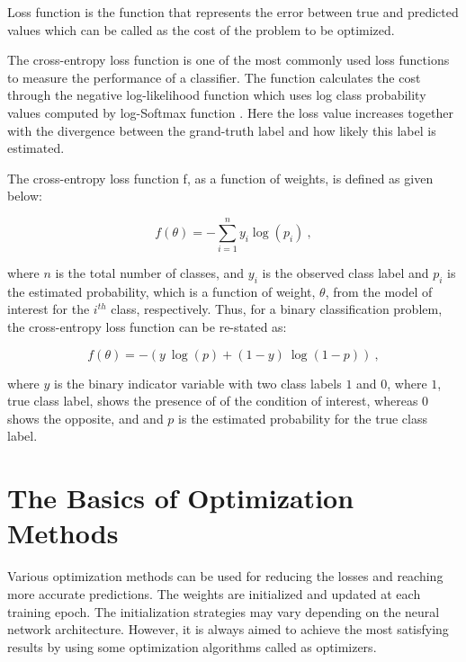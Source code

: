 Loss function is the function that represents the error between true and predicted values which can be called as the cost of the problem to be optimized.

The cross-entropy loss function is one of the most commonly used loss functions to measure the performance of a classifier. The function calculates the cost through the negative log-likelihood function \cite{negative-ll} which uses log class probability values computed by log-Softmax function \cite{logsoftmax}. Here the loss value increases together with the divergence between the grand-truth label and how likely this label is estimated.

The cross-entropy loss function f, as a function of weights, is defined as given below:

\begin{equation}
\label{eq:cross_entropy_loss_formulae}
    f(\theta) = - \sum_{i=1}^{n} y_{i} \log(p_{i}) \:,
\end{equation}

where $n$ is the total number of classes, and $y_{i}$ is the observed class label and $p_{i}$ is the estimated probability, which is a function of weight, $\theta$, from the model of interest for the $i^{th}$ class, respectively. Thus, for a binary classification problem, the cross-entropy loss function can be re-stated as:

\begin{equation}
\label{eq:binary_cross_entropy_loss_formulae}
    f(\theta) = - \left ( y\:\log(p) + (1 - y)\:\log(1-p) \right ) \:,
\end{equation}

where $y$ is the binary indicator variable with two class labels $1$ and $0$, where $1$, true class label, shows the presence of of the condition of interest, whereas $0$ shows the opposite, and and $p$ is the estimated probability for the true class label.

\section{The Basics of Optimization Methods}
\label{sec:CH3_the_basics_of_optimization}

Various optimization methods can be used for reducing the losses and reaching more accurate predictions. The weights are initialized and updated at each training epoch. The initialization strategies may vary depending on the neural network architecture. However, it is always aimed to achieve the most satisfying results by using some optimization algorithms called as optimizers.


